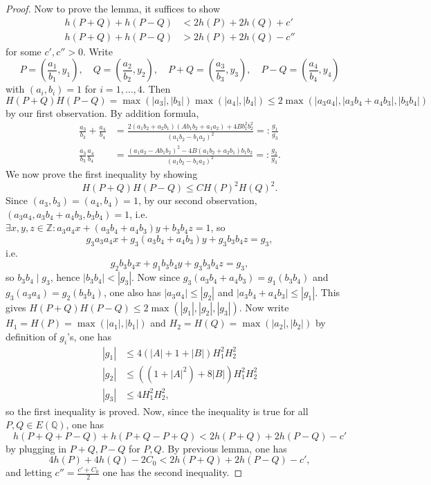 \documentclass{article}
\newcommand{\Z}{\mathbb{Z}}
\newcommand{\Q}{\mathbb{Q}}
\theoremstyle{definition}
\begin{document}
\begin{proof}
Now to prove the lemma, it suffices to show
\[
\begin{aligned}
h(P+Q)+h(P-Q)&<2h(P)+2h(Q)+c' \\
h(P+Q)+h(P-Q)&>2h(P)+2h(Q)-c''
\end{aligned}
\]
for some $c',c''>0$. Write
\[
P=\left(\frac{a_1}{b_1},y_1\right),\quad Q=\left(\frac{a_2}{b_2},y_2\right),\quad P+Q=\left(\frac{a_3}{b_3},y_3\right),\quad P-Q=\left(\frac{a_4}{b_4},y_4\right)
\]
with $(a_i,b_i)=1$ for $i=1,\ldots,4$. Then
\[
H(P+Q)H(P-Q)=\max(|a_3|,|b_3|)\max(|a_4|,|b_4|)\leq 2\max(|a_3a_4|,|a_3b_4+a_4b_3|,|b_3b_4|)
\]
by our first observation. By addition formula,
\[
\begin{aligned}
\frac{a_3}{b_3}+\frac{a_4}{b_4}&=\frac{2(a_1b_2+a_2b_1)(Ab_1b_2+a_1a_2)+4Bb_1^2b_2^2}{(a_1b_2-b_1a_2)^2}=:\frac{g_1}{g_3} \\
\frac{a_3}{b_3}\frac{a_4}{b_4}&=\frac{(a_1a_2-Ab_1b_2)^2-4B(a_1b_2+a_2b_1)b_1b_2}{(a_1b_2-b_1a_2)^2}=:\frac{g_2}{g_3}.
\end{aligned}
\]
We now prove the first inequality by showing
\[
H(P+Q)H(P-Q)\leq CH(P)^2H(Q)^2.
\]
Since $(a_3,b_3)=(a_4,b_4)=1$, by our second observation, $(a_3a_4,a_3b_4+a_4b_3,b_3b_4)=1$, i.e. $\exists x,y,z\in\Z:a_3a_4x+(a_3b_4+a_4b_3)y+b_3b_4z=1$, so
\[
g_3a_3a_4x+g_3(a_3b_4+a_4b_3)y+g_3b_3b_4z=g_3,
\]
i.e.
\[
g_2b_3b_4x+g_1b_3b_4y+g_3b_3b_4z=g_3,
\]
so $b_3b_4\mid g_3$, hence $|b_3b_4|<|g_3|$. Now since $g_3(a_3b_4+a_4b_3)=g_1(b_3b_4)$ and $g_3(a_3a_4)=g_2(b_3b_4)$, one also has $|a_3a_4|\leq |g_2|$ and $|a_3b_4+a_4b_3|\leq |g_1|$. This gives $H(P+Q)H(P-Q)\leq 2\max(|g_1|,|g_2|,|g_3|)$. Now write $H_1=H(P)=\max(|a_1|,|b_1|)$ and $H_2=H(Q)=\max(|a_2|,|b_2|)$ by definition of $g_i$'s, one has
\[
\begin{aligned}
|g_1|&\leq 4(|A|+1+|B|)H_1^2H_2^2 \\
|g_2|&\leq ((1+|A|^2)+8|B|)H_1^2H_2^2 \\
|g_3|&\leq 4H_1^2H_2^2,
\end{aligned}
\]
so the first inequality is proved. Now, since the inequality is true for all $P,Q\in E(\Q)$, one has
\[
h(P+Q+P-Q)+h(P+Q-P+Q)<2h(P+Q)+2h(P-Q)-c'
\]
by plugging in $P+Q,P-Q$ for $P,Q$. By previous lemma, one has
\[
4h(P)+4h(Q)-2C_0<2h(P+Q)+2h(P-Q)-c',
\]
and letting $c''=\frac{c'+C_0}{2}$ one has the second inequality.
\end{proof}
\end{document}
